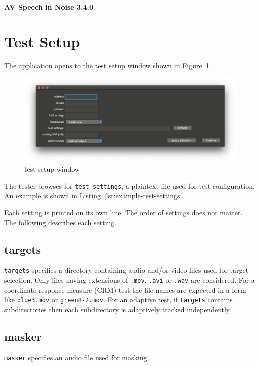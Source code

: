 \documentclass[11pt,pdftex,letterpaper]{article}
\begin{document}
\vspace*{30ex}
\begin{center}
\textbf{AV Speech in Noise 3.4.0}
\end{center}
\pagebreak
\tableofcontents
\pagebreak

\section{Test Setup}
The application opens to the test setup window shown in Figure~\ref{fig:test-setup-window}.
\begin{figure}
	\centering
	\includegraphics[width = 0.9\linewidth]{test-setup-window.png}
	\caption{test setup window}
	\label{fig:test-setup-window}
\end{figure}
The tester browses for \texttt{test settings}, a plaintext file used for test configuration. An example is shown in Listing~\ref{lst:example-test-settings}.

\noindent\begin{minipage}{\textwidth}
	
\end{minipage}
Each setting is printed on its own line. The order of settings does not matter. The following describes each setting.
\subsection{targets}
\texttt{targets} specifies a directory containing audio and/or video files used for target selection. Only files having extensions of \texttt{.mov}, \texttt{.avi} or \texttt{.wav} are considered. For a coordinate response measure (CRM) test the file names are expected in a form like \texttt{blue3.mov} or \texttt{green8-2.mov}. For an adaptive test, if \texttt{targets} contains subdirectories then each subdirectory is adaptively tracked independently.
\subsection{masker}
\texttt{masker} specifies an audio file used for masking.
\end{document}
